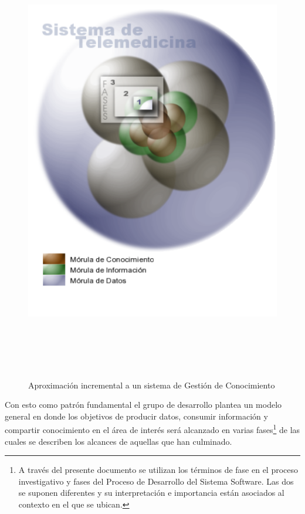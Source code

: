 \begin{figure}
 \centering
 \includegraphics[width=156mm, height=195mm]{modelo_fases.png}
 \caption{Aproximación incremental a un sistema de Gestión de Conocimiento}
 \label{modelo1}
\end{figure}

Con esto como patrón fundamental el grupo de desarrollo plantea un modelo general en donde los objetivos de producir datos, consumir información y compartir conocimiento en el área de interés será alcanzado en varias fases\footnote{A través del presente documento se utilizan los términos de fase en el proceso investigativo y fases del Proceso de Desarrollo del Sistema Software. Las dos se suponen diferentes y su interpretación e importancia están asociados al contexto en el que se ubican.} de las cuales se describen los alcances de aquellas que han culminado.

